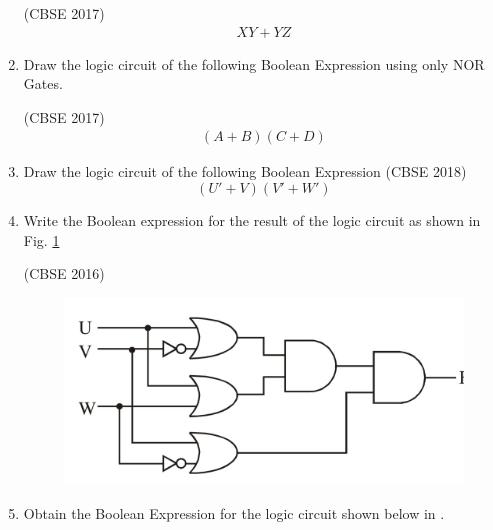 \begin{enumerate}[label=\arabic*.,ref=\theenumi]
\hfill (CBSE 2017)
\label{prob:2017-1/c/6/b}
		\begin{align*}
 XY + YZ
		\end{align*}
\item Draw the logic circuit of the following Boolean Expression using only NOR Gates.  

\hfill (CBSE 2017)
\label{prob:2017/c/6/b}
      \begin{align*}
      (A+B)(C+D)
      \end{align*}
\item Draw the logic circuit of the following Boolean Expression
\hfill (CBSE 2018)
\label{prob:2018/c/6/b}
\begin{equation*} 
(U'+V)(V'+W')
\end{equation*}
\item 
\label{prob:2016/c/6/b}
Write the Boolean expression for the result of the logic circuit as shown in Fig.  
\ref{fig:2016/c/6/b}

\hfill (CBSE 2016)
\begin{figure}[H]
\centering
\includegraphics[width=0.5\columnwidth]{figs/cbse-2016.jpg}
\caption{}
\label{fig:2016/c/6/b}
\end{figure}
\item 
Obtain the Boolean Expression for the logic circuit shown below
in .
\label{prob:1993/gate/ec/4/8}


\end{enumerate}
